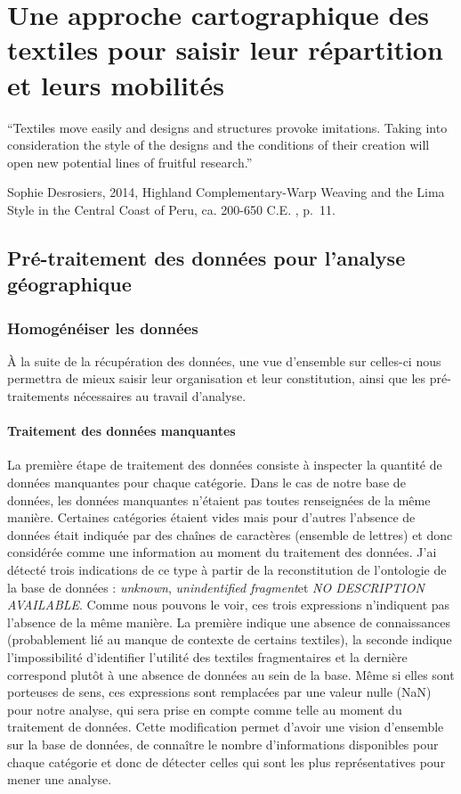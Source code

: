 \chapter{Une approche cartographique des textiles pour saisir leur répartition et leurs mobilités}
\markboth{}{}

\epigraph{\textquotedblleft Textiles move easily and designs and structures provoke imitations. Taking into consideration the style of the designs and the conditions of their creation will open new potential lines of fruitful research.\textquotedblright}{Sophie Desrosiers, 2014, \og Highland Complementary-Warp Weaving and the Lima Style in the Central Coast of Peru, ca. 200-650 C.E. \fg, p.~11.}


\section[Pré-traitement des données pour l'analyse géographique]{Pré-traitement des données pour l'analyse géographique}

\subsection{Homogénéiser les données}

À la suite de la récupération des données, une vue d'ensemble sur celles-ci nous permettra de mieux saisir leur organisation et leur constitution, ainsi que les pré-traitements nécessaires au travail d'analyse.

\subsubsection{Traitement des données manquantes}

La première étape de traitement des données consiste à inspecter la quantité de données manquantes pour chaque catégorie. 
Dans le cas de notre base de données, les données manquantes n'étaient pas toutes renseignées de la même manière. 
Certaines catégories étaient vides mais pour d'autres l'absence de données était indiquée par des chaînes de caractères (ensemble de lettres) et donc considérée comme une information au moment du traitement des données. 
J'ai détecté trois indications de ce type à partir de la reconstitution de l'ontologie de la base de données : \og \textit{unknown}\fg, \og \textit{unindentified fragment}\fg \:et \og \textit{NO DESCRIPTION AVAILABLE}\fg. Comme nous pouvons le voir, ces trois expressions n'indiquent pas l'absence de la même manière. La première indique une absence de connaissances (probablement lié au manque de contexte de certains textiles), la seconde indique l'impossibilité d'identifier l'utilité des textiles fragmentaires et la dernière correspond plutôt à une absence de données au sein de la base. Même si elles sont porteuses de sens, ces expressions sont remplacées par une valeur nulle (NaN) pour notre analyse, qui sera prise en compte comme telle au moment du traitement de données. Cette modification permet d'avoir une vision d'ensemble sur la base de données, de connaître le nombre d'informations disponibles pour chaque catégorie et donc de détecter celles qui sont les plus représentatives pour mener une analyse.

